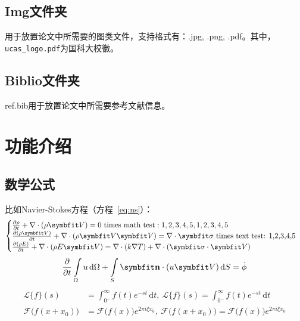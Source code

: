 {\subsection{Img文件夹}

用于放置论文中所需要的图类文件，支持格式有：.jpg, .png, .pdf。其中，\verb|ucas_logo.pdf|为国科大校徽。

\subsection{Biblio文件夹}

 ref.bib用于放置论文中所需要参考文献信息。

\section{功能介绍}

\subsection{数学公式}

比如Navier-Stokes方程（方程~\eqref{eq:ns}）：
\begin{equation} \label{eq:ns}
    \begin{cases}
        \frac{\partial \rho}{\partial t} + \nabla\cdot(\rho\Vector{V}) = 0 \ \mathrm{times\ math\ test: 1,2,3,4,5}, 1,2,3,4,5\\
        \frac{\partial (\rho\Vector{V})}{\partial t} + \nabla\cdot(\rho\Vector{V}\Vector{V}) = \nabla\cdot\Tensor{\sigma} \ \text{times text test: 1,2,3,4,5}\\
        \frac{\partial (\rho E)}{\partial t} + \nabla\cdot(\rho E\Vector{V}) = \nabla\cdot(k\nabla T) + \nabla\cdot(\Tensor{\sigma}\cdot\Vector{V})
    \end{cases}
\end{equation}
\begin{equation}
    \frac{\partial }{\partial t}\int\limits_{\Omega} u \, \mathrm{d}\Omega + \int\limits_{S} \unitVector{n}\cdot(u\Vector{V}) \, \mathrm{d}S = \dot{\phi}
\end{equation}
\[
    \begin{split}
        \mathcal{L} \{f\}(s) &= \int _{0^{-}}^{\infty} f(t) e^{-st} \, \mathrm{d}t, \ 
        \mathscr{L} \{f\}(s) = \int _{0^{-}}^{\infty} f(t) e^{-st} \, \mathrm{d}t\\
        \mathcal{F} {\bigl (} f(x+x_{0}) {\bigr )} &= \mathcal{F} {\bigl (} f(x) {\bigr )} e^{2\pi i\xi x_{0}}, \ 
        \mathscr{F} {\bigl (} f(x+x_{0}) {\bigr )} = \mathscr{F} {\bigl (} f(x) {\bigr )} e^{2\pi i\xi x_{0}}
    \end{split}
\]

}
